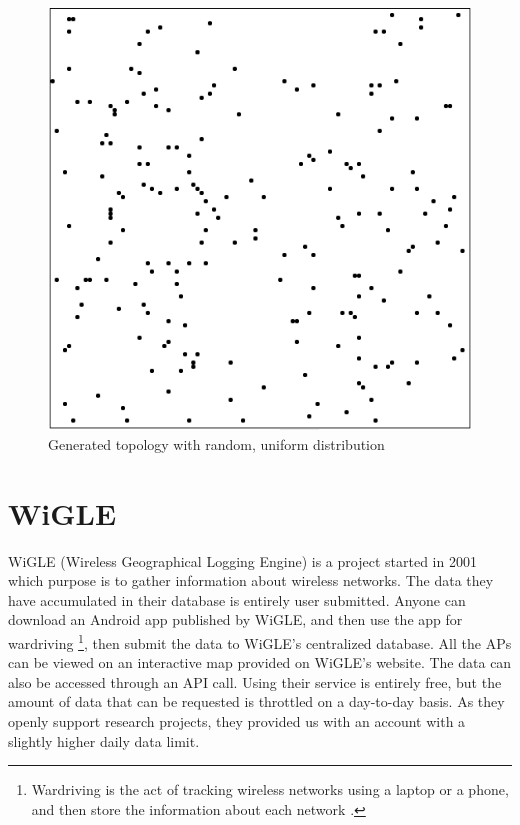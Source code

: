 \begin{figure}
\center
\includegraphics[scale=0.4]{Images/randomtopology.png}
\caption{Generated topology with random, uniform distribution}
\label{fig:randtop}
\end{figure}

\section{WiGLE}
WiGLE (Wireless Geographical Logging Engine) \cite{wigle} is a project started in 2001
which purpose is to gather information about wireless networks. The data they have
accumulated in their database is entirely user submitted. Anyone can download an 
Android app  published by WiGLE, and then use the app for wardriving
\footnote{Wardriving is the act of tracking wireless networks using a laptop or a phone,
	and then store the information about each network \cite{Wardriving}.},
	then submit the data to WiGLE's centralized database. All the APs can be viewed on an interactive
	map provided on WiGLE's website. The data can also be accessed through an API call.
	Using their service is entirely free, but the amount of data
	that can be requested is throttled on a day-to-day basis. As they openly support
	research projects, they provided us with an account with a slightly higher daily data
	limit.

